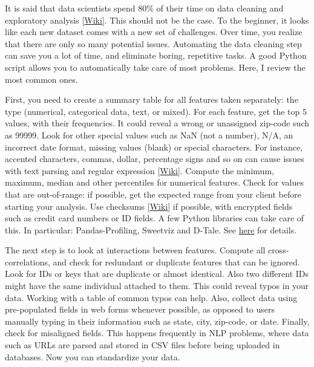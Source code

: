 \documentclass[oneside,10pt]{book}
\begin{document}
It is said that data scientists spend $80\%$ of their time on data cleaning and \textcolor{index}{exploratory analysis} [\href{https://en.wikipedia.org/wiki/Exploratory_data_analysis}{Wiki}]. This should not be the case. To the beginner, it looks like each new dataset comes with a new set of challenges.
 Over time, you realize that there are only so many potential issues. Automating the data cleaning step can save you a lot of time, and eliminate boring, repetitive tasks. A good Python script allows you to automatically take care of most problems. Here, I review the most common ones. 

First, you need to create a summary table for all features taken separately: the type (numerical, categorical data, text, or mixed). For each feature, get the top $5$ values, with their frequencies. It could reveal a wrong or unassigned zip-code such as 99999. Look for other special values such as NaN (not a number), N/A, an incorrect date format, missing values (blank) or special characters. For instance,  accented characters, commas, dollar, percentage signs and so on can cause issues with text parsing  and \textcolor{index}{regular expression} [\href{https://en.wikipedia.org/wiki/Regular_expression}{Wiki}]. Compute the minimum, maximum, median and other percentiles for numerical features. Check for values that are out-of-range: if possible, get the expected range from your client before starting your analysis. Use 
\textcolor{index}{checksums} [\href{https://en.wikipedia.org/wiki/Checksum}{Wiki}] 
if possible, with encrypted fields such as credit card numbers or ID fields. 
A few Python libraries can take care of this. In particular: Pandas-Profiling, Sweetviz and D-Tale. See \href{https://medium.com/@karteekmenda93/exploratory-data-analysis-tools-83ef538c879f}{here} for details. 

The next step is to look at interactions between features. Compute all cross-correlations, and check for redundant or duplicate features that can be ignored. Look for IDs or keys that are duplicate or almost identical. Also two different IDs might have the same individual attached to them. This could reveal typos in your data. Working with a table of common typos can help. Also, collect data using 
pre-populated fields in web forms whenever possible, as opposed to users manually typing in their information such as state, city, zip-code, or date. Finally, check for misaligned fields. This happens frequently in NLP problems, where data such as URLs are parsed and stored in CSV files before being uploaded in databases. Now you can standardize your data. 
\end{document}
